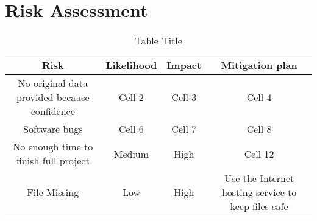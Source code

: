
\section{Risk Assessment}
\begin{table}[htbp]
\centering
\small
\setlength\tabcolsep{2pt}
\begin{tabular}{|c|c|c|c|}
\hline
\textbf{Risk} & \textbf{Likelihood} & \textbf{Impact} & \textbf{Mitigation plan} \\
\hline
No original data provided because confidence  & Cell 2 & Cell 3 & Cell 4 \\
\hline
Software bugs & Cell 6 & Cell 7 & Cell 8 \\
\hline
No enough time to finish full project & Medium & High & Cell 12 \\
\hline
File Missing & Low & High & Use the Internet hosting service to keep files safe \\
\hline
\end{tabular}
\caption{Table Title}
\label{tab:table-label}
\end{table}

%


%

